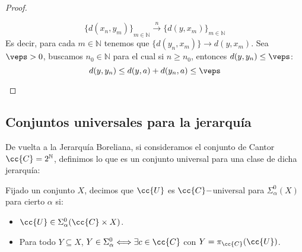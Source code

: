 \begin{teo}
\begin{proof}
\begin{itemize}
                \begin{equation*}
                    {\{d(x_n,y_m)\}}_{m\in \mathbb{N}} \stackrel{n}{\to} {\{d(y,x_m)\}}_{m\in \mathbb{N}}
                \end{equation*}
                Es decir, para cada $m\in \mathbb{N}$ tenemos que $\{d(y_n,x_m)\} \to d(y,x_m)$. Sea $\veps > 0$, buscamos $n_0\in \mathbb{N}$ para el cual si $n\geq n_0$, entonces $d(y,y_n) \leq \veps$:
                \begin{equation*}
                    d(y,y_n) \leq d(y,a) + d(y_n,a) \leq \veps
                \end{equation*}
        \end{itemize}
    \end{proof}
\end{teo}

\subsection{Conjuntos universales para la jerarquía}
De vuelta a la Jerarquía Boreliana, si consideramos el conjunto de Cantor $\cc{C} = 2^{\mathbb{N}}$, definimos lo que es un conjunto universal para una clase de dicha jerarquía:
\begin{definicion}
    Fijado un conjunto $X$, decimos que $\cc{U}$ es $\cc{C}-$universal para $\Sigma^0_\alpha(X)$ para cierto $\alpha$ si:
    \begin{itemize}
        \item $\cc{U}\in \Sigma^0_\alpha(\cc{C}\times X)$.
        \item Para todo $Y\subseteq X$, $Y\in \Sigma^0_\alpha \Longleftrightarrow \exists c\in \cc{C} $ con $Y = \pi_{\cc{C}}(\cc{U})$.
    \end{itemize}
\end{definicion}

